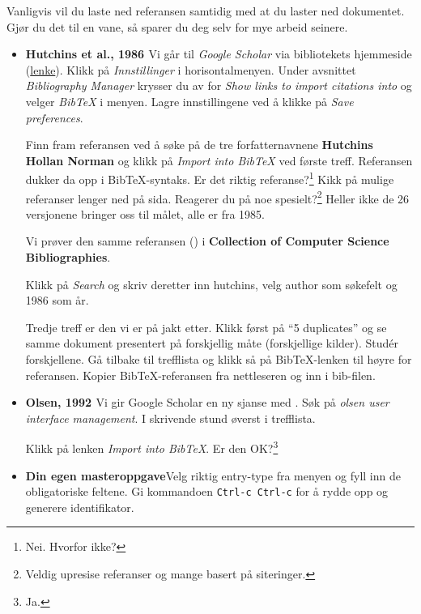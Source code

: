 \documentclass[11pt,norsk,a4paper]{article}
\newcommand{\kdo}[1]{\texttt{#1}}
\newcommand{\bt}{BibTeX{}}
\begin{document}
Vanligvis vil du laste ned referansen samtidig med at du laster ned
dokumentet. Gjør du det til en vane, så sparer du deg selv for mye
arbeid seinere.

\begin{itemize}

\item\textbf{Hutchins et al., 1986 \cite{hutchins1986}}\newline Vi går
  til \textit{Google Scholar} via bibliotekets hjemmeside (\href{https://www.ub.uio.no/informatikk}{lenke}). Klikk på
  \textit{Innstillinger} i horisontalmenyen. Under avsnittet
  \textit{Bibliography Manager} krysser du av for \textit{Show links
    to import citations into} og velger \textit{BibTeX} i
  menyen. Lagre innstillingene ved å klikke på \textit{Save
    preferences}.

  Finn fram referansen ved å søke på de tre forfatternavnene
  \textbf{Hutchins Hollan Norman} og klikk på \textit{Import into BibTeX}
  ved første treff. Referansen dukker da opp i BibTeX-syntaks. Er det
  riktig referanse?\footnote{Nei. Hvorfor ikke?} Kikk på mulige
  referanser lenger ned på sida. Reagerer du på noe
  spesielt?\footnote{Veldig upresise referanser og mange basert på
    siteringer.} Heller ikke de 26 versjonene bringer oss til målet, alle er fra 1985.

  Vi prøver den samme referansen (\cite{hutchins1986}) i
  \textbf{Collection of Computer Science Bibliographies}\cite{achilles}.

Klikk på \textit{Search} og skriv deretter inn hutchins, velg author
som søkefelt og 1986 som år.

Tredje treff er den vi er på jakt etter. Klikk først på ``5
duplicates'' og se samme dokument presentert på forskjellig måte
(forskjellige kilder). Studér forskjellene. Gå tilbake til trefflista
og klikk så på \bt-lenken til høyre
for referansen. Kopier \bt-referansen fra nettleseren og inn i
bib-filen.

\item\textbf{Olsen, 1992 \cite{olsen1992}}\newline Vi gir Google
  Scholar en ny sjanse med \cite{olsen1992}.  Søk på \textit{olsen
    user interface management}. I skrivende stund øverst i trefflista.

Klikk på lenken \textit{Import into \bt}. Er den OK?\footnote{Ja.}

\item\textbf{Din egen masteroppgave}\newline Velg riktig entry-type fra
  menyen og fyll inn de obligatoriske feltene. Gi kommandoen
  \kdo{Ctrl-c Ctrl-c} for å rydde opp og generere identifikator.


\end{itemize}
\end{document}
